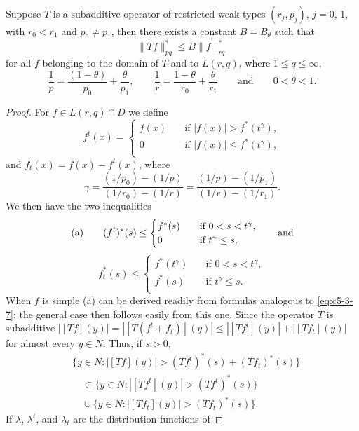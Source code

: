\begin{theorem}\label{thm:c5-3-15}
Suppose $T$ is a subadditive operator of restricted weak types $(r_{j}, p_{j})$,
$j = 0$, 1, with $r_{0} < r_{1}$ and $p_{0} \neq p_{1}$, then there exists a
constant $B = B_{\theta}$ such that
\[
\|Tf\|_{pq}^{*}\leq B\|f\|_{rq}^{*}
\]
for all $f$ belonging to the domain of $T$ and to $L(r, q)$, where
$1 \leq q \leq \infty$,
\[
\frac{1}{p}=\frac{(1-\theta)}{p_{0}}+\frac{\theta}{p_{1}},\qquad
\frac{1}{r}=\frac{1-\theta}{r_{0}}+\frac{\theta}{r_{1}}
\qquad\text{and}\qquad 0<\theta<1.
\]
\end{theorem}

\begin{proof}
For $f \in L(r, q) \cap D$ we define
\[
f^{t}(x)=\begin{cases}
f(x) & \quad\text{if } |f(x)| > f^{*}(t^{\gamma}),\\
0 & \quad\text{if } |f(x)| \leq f^{*}(t^{\gamma}),\\
\end{cases}
\]
and $f_{t}(x) = f(x) - f^{t}(x)$, where
\[
\gamma=\frac{(1/p_{0})-(1/p)}{(1/r_{0})-(1/r)}
=\frac{(1/p)-(1/p_{1})}{(1/r)-(1/r_{1})}.
\]
We then have the two inequalities
\[
\textup{(a)}\qquad
(f^{t})^{*}(s)\leq\begin{cases}
f^{*}(s) & \quad\text{if } 0 < s < t^{\gamma},\\
0 & \quad\text{if } t^{\gamma} \leq s,\\
\end{cases}
\qquad\text{and}
\]
\[
f_{t}^{*}(s)\leq\begin{cases}
f^{*}(t^{\gamma}) & \quad\text{if } 0 < s < t^{\gamma},\\
f^{*}(s) & \quad\text{if } t^{\gamma} \leq s.\\
\end{cases}
\]
When $f$ is simple (a) can be derived readily from formulas analogous to
\eqref{eq:c5-3-7}; the general case then follows easily from this one. Since the
operator $T$ is subadditive
$|[Tf](y)| = |[T(f^{t} + f_{t})](y)| \leq |[Tf^{t}](y)| + |[Tf_{t}](y)|$ for
almost every $y \in N$. Thus, if $s > 0$,
\begin{align*}
&\{y \in N:{}|[Tf](y)|>(Tf^{t})^{*}(s)+(Tf_{t})^{*}(s)\}\\
&\quad\subset\{y \in N : |[Tf^{t}](y)|>(Tf^{t})^{*}(s)\}\\
&\quad\cup\{y \in N : |[Tf_{t}](y)|>(Tf_{t})^{*}(s)\}.
\end{align*}
If $\lambda$, $\lambda^{t}$, and $\lambda_{t}$ are the distribution functions of

\end{proof}
